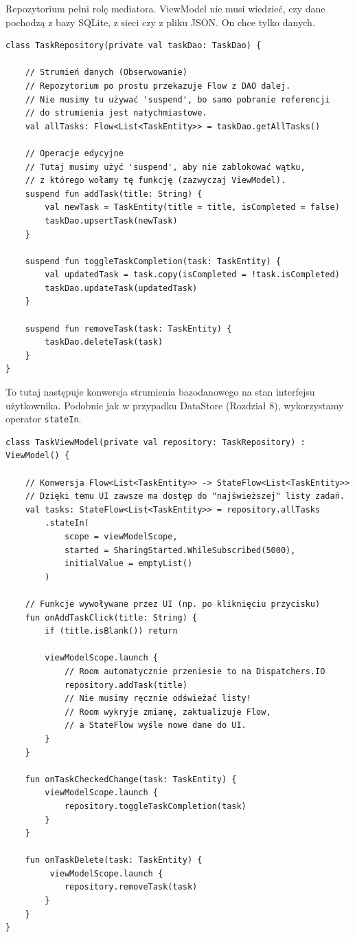 Repozytorium pełni rolę mediatora. ViewModel nie musi wiedzieć, czy dane pochodzą z bazy SQLite, z sieci czy z pliku JSON. On chce tylko danych.

\begin{verbatim}
class TaskRepository(private val taskDao: TaskDao) {

    // Strumień danych (Obserwowanie)
    // Repozytorium po prostu przekazuje Flow z DAO dalej.
    // Nie musimy tu używać 'suspend', bo samo pobranie referencji 
    // do strumienia jest natychmiastowe.
    val allTasks: Flow<List<TaskEntity>> = taskDao.getAllTasks()

    // Operacje edycyjne
    // Tutaj musimy użyć 'suspend', aby nie zablokować wątku,
    // z którego wołamy tę funkcję (zazwyczaj ViewModel).
    suspend fun addTask(title: String) {
        val newTask = TaskEntity(title = title, isCompleted = false)
        taskDao.upsertTask(newTask)
    }

    suspend fun toggleTaskCompletion(task: TaskEntity) {
        val updatedTask = task.copy(isCompleted = !task.isCompleted)
        taskDao.updateTask(updatedTask)
    }
    
    suspend fun removeTask(task: TaskEntity) {
        taskDao.deleteTask(task)
    }
}
\end{verbatim}

To tutaj następuje konwersja strumienia bazodanowego na stan interfejsu użytkownika. Podobnie jak w przypadku DataStore (Rozdział 8), wykorzystamy operator \texttt{stateIn}.

\begin{verbatim}
class TaskViewModel(private val repository: TaskRepository) : ViewModel() {

    // Konwersja Flow<List<TaskEntity>> -> StateFlow<List<TaskEntity>>
    // Dzięki temu UI zawsze ma dostęp do "najświeższej" listy zadań.
    val tasks: StateFlow<List<TaskEntity>> = repository.allTasks
        .stateIn(
            scope = viewModelScope,
            started = SharingStarted.WhileSubscribed(5000),
            initialValue = emptyList()
        )

    // Funkcje wywoływane przez UI (np. po kliknięciu przycisku)
    fun onAddTaskClick(title: String) {
        if (title.isBlank()) return
        
        viewModelScope.launch {
            // Room automatycznie przeniesie to na Dispatchers.IO
            repository.addTask(title)
            // Nie musimy ręcznie odświeżać listy!
            // Room wykryje zmianę, zaktualizuje Flow, 
            // a StateFlow wyśle nowe dane do UI.
        }
    }

    fun onTaskCheckedChange(task: TaskEntity) {
        viewModelScope.launch {
            repository.toggleTaskCompletion(task)
        }
    }
    
    fun onTaskDelete(task: TaskEntity) {
         viewModelScope.launch {
            repository.removeTask(task)
        }
    }
}
\end{verbatim}

